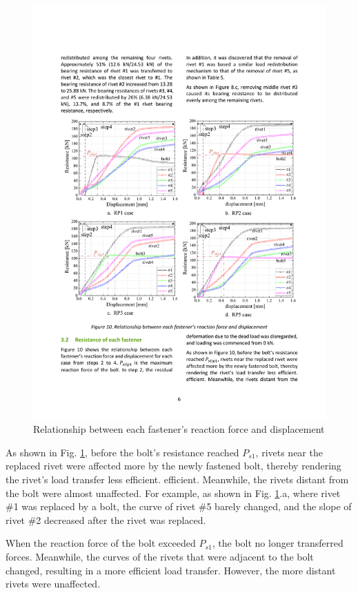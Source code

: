 \begin{figure}[htbp]
    \centering
    \includegraphics[width=\textwidth]{imgs/ch4/fig-l10.pdf}
    \caption{Relationship between each fastener’s reaction force and displacement}
    \label{fig-l10}
\end{figure}

As shown in Fig. \ref{fig-l10}, before the bolt’s resistance reached $P_{s1}$, rivets near the replaced rivet were affected more by the newly fastened bolt, thereby rendering the rivet’s load transfer less efficient. efficient. Meanwhile, the rivets distant from the bolt were almost unaffected. For example, as shown in Fig. \ref{fig-l10}.a, where rivet \#1 was replaced by a bolt, the curve of rivet \#5 barely changed, and the slope of rivet \#2 decreased after the rivet was replaced.

When the reaction force of the bolt exceeded $P_{s1}$, the bolt no longer transferred forces. Meanwhile, the curves of the rivets that were adjacent to the bolt changed, resulting in a more efficient load transfer. However, the more distant rivets were unaffected.

